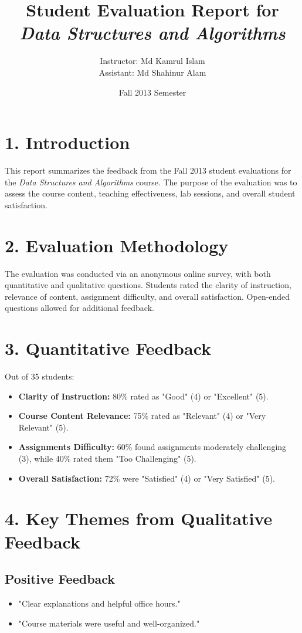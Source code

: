 \documentclass{article}
\title{Student Evaluation Report for \textit{Data Structures and Algorithms}}
\author{Instructor: Md Kamrul Islam \\Assistant: Md Shahinur Alam}
\date{Fall 2013 Semester}
\begin{document}
\maketitle

\section*{1. Introduction}
This report summarizes the feedback from the Fall 2013 student evaluations for the \textit{Data Structures and Algorithms} course. The purpose of the evaluation was to assess the course content, teaching effectiveness, lab sessions, and overall student satisfaction.

\section*{2. Evaluation Methodology}
The evaluation was conducted via an anonymous online survey, with both quantitative and qualitative questions. Students rated the clarity of instruction, relevance of content, assignment difficulty, and overall satisfaction. Open-ended questions allowed for additional feedback.

\section*{3. Quantitative Feedback}
Out of 35 students:
\begin{itemize}
    \item \textbf{Clarity of Instruction:} 80\% rated as "Good" (4) or "Excellent" (5).
    \item \textbf{Course Content Relevance:} 75\% rated as "Relevant" (4) or "Very Relevant" (5).
    \item \textbf{Assignments Difficulty:} 60\% found assignments moderately challenging (3), while 40\% rated them "Too Challenging" (5).
    \item \textbf{Overall Satisfaction:} 72\% were "Satisfied" (4) or "Very Satisfied" (5).
\end{itemize}

\section*{4. Key Themes from Qualitative Feedback}
\subsection*{Positive Feedback}
\begin{itemize}
    \item "Clear explanations and helpful office hours."
    \item "Course materials were useful and well-organized."
\end{itemize}
\end{document}
